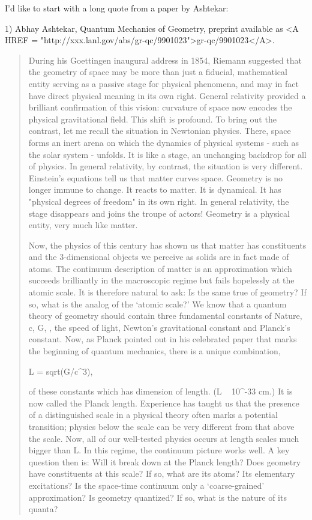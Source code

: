 


I'd like to start with a long quote from a paper by Ashtekar:

1) Abhay Ashtekar, Quantum Mechanics of Geometry, preprint available 
as <A HREF = "http://xxx.lanl.gov/abs/gr-qc/9901023">gr-qc/9901023</A>.

\begin{quote}
During his Goettingen inaugural address in 1854, Riemann suggested that
the geometry of space may be more than just a fiducial, mathematical
entity serving as a passive stage for physical phenomena, and may in
fact have direct physical meaning in its own right. General relativity
provided a brilliant confirmation of this vision: curvature of space now
encodes the physical gravitational field.  This shift is profound.  To
bring out the contrast, let me recall the situation in Newtonian
physics.  There, space forms an inert arena on which the dynamics of
physical systems - such as the solar system - unfolds.  It is like a
stage, an unchanging backdrop for all of physics.  In general
relativity, by contrast, the situation is very different.  Einstein's
equations tell us that matter curves space.  Geometry is no longer
immune to change.  It reacts to matter.  It is dynamical.  It has
"physical degrees of freedom" in its own right.  In general relativity,
the stage disappears and joins the troupe of actors!  Geometry is a
physical entity, very much like matter.

Now, the physics of this century has shown us that matter has
constituents and the 3-dimensional objects we perceive as solids are in
fact made of atoms.  The continuum description of matter is an
approximation which succeeds brilliantly in the macroscopic regime but
fails hopelessly at the atomic scale.  It is therefore natural to ask:
Is the same true of geometry?  If so, what is the analog of the `atomic
scale?'  We know that a quantum theory of geometry should contain three
fundamental constants of Nature, c, G, \hbar , the speed of light,
Newton's gravitational constant and Planck's constant.  Now, as Planck
pointed out in his celebrated paper that marks the beginning of quantum
mechanics, there is a unique combination, 

L = sqrt(\hbar  G/c^3), 

of these constants which has dimension of length.  (L ~ 10^{-33} cm.) 
It is now called the Planck length.  Experience has taught us that the
presence of a distinguished scale in a physical theory often marks a
potential transition; physics below the scale can be very different from
that above the scale.  Now, all of our well-tested physics occurs at
length scales much bigger than L. In this regime, the continuum
picture works well.  A key question then is: Will it break down at the
Planck length?  Does geometry have constituents at this scale?  If so,
what are its atoms?  Its elementary excitations?  Is the space-time
continuum only a `coarse-grained' approximation?  Is geometry quantized? 
If so, what is the nature of its quanta?


\end{quote}
